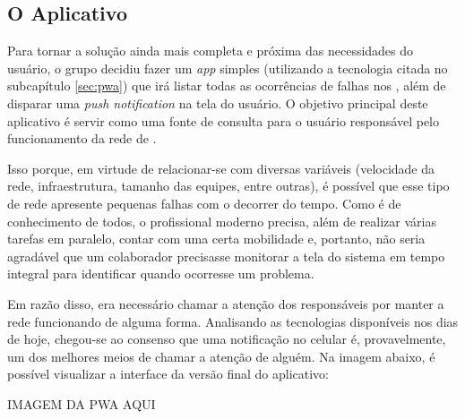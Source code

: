 \subsection{O Aplicativo}
\label{subsec:o_aplicativo}

Para tornar a solução ainda mais completa e próxima das necessidades do usuário, o grupo decidiu fazer um \textit{app} simples (utilizando a tecnologia citada no subcapítulo \ref{sec:pwa}) que irá listar todas as ocorrências de falhas nos \containers{}, além de disparar uma \textit{push notification} na tela do usuário. O objetivo principal deste aplicativo é servir como uma fonte de consulta para o usuário responsável pelo funcionamento da rede de \containers{}.

Isso porque, em virtude de relacionar-se com diversas variáveis (velocidade da rede, infraestrutura, tamanho das equipes, entre outras), é possível que esse tipo de rede apresente pequenas falhas com o decorrer do tempo. Como é de conhecimento de todos, o profissional moderno precisa, além de realizar várias tarefas em paralelo, contar com uma certa mobilidade e, portanto, não seria agradável que um colaborador precisasse monitorar a tela do sistema em tempo integral para identificar quando ocorresse um problema.

Em razão disso, era necessário chamar a atenção dos responsáveis por manter a rede funcionando de alguma forma. Analisando as tecnologias disponíveis nos dias de hoje, chegou-se ao consenso que uma notificação no celular é, provavelmente, um dos melhores meios de chamar a atenção de alguém. Na imagem abaixo, é possível visualizar a interface da versão final do aplicativo:

{\huge IMAGEM DA PWA AQUI}